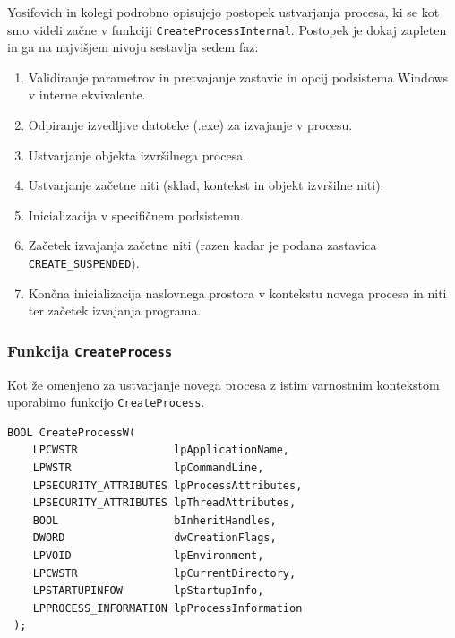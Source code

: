 \documentclass[a4paper,12pt,openright]{book}
\begin{document}
Yosifovich in kolegi \cite{Yosifovich_Russinovich_Solomon_Ionescu_2017} podrobno opisujejo postopek ustvarjanja procesa, ki se kot smo videli začne v funkciji \texttt{CreateProcessInternal}.
Postopek je dokaj zapleten in ga na najvišjem nivoju sestavlja sedem faz:
\begin{enumerate}
	\item Validiranje parametrov in pretvajanje zastavic in opcij podsistema Windows v interne ekvivalente.
	\item Odpiranje izvedljive datoteke (.exe) za izvajanje v procesu.
	\item Ustvarjanje objekta izvršilnega procesa.
	\item Ustvarjanje začetne niti (sklad, kontekst in objekt izvršilne niti).
	\item Inicializacija v specifičnem podsistemu.
	\item Začetek izvajanja začetne niti (razen kadar je podana zastavica \texttt{CREATE\_SUSPENDED}).
	\item Končna inicializacija naslovnega prostora v kontekstu novega procesa in niti ter začetek izvajanja programa.
\end{enumerate}

\subsubsection{Funkcija \texttt{CreateProcess}}

Kot že omenjeno za ustvarjanje novega procesa z istim varnostnim kontekstom uporabimo funkcijo \texttt{CreateProcess}.

\begin{lstlisting}[style=func]
 BOOL CreateProcessW(
	LPCWSTR               lpApplicationName,
	LPWSTR                lpCommandLine,
	LPSECURITY_ATTRIBUTES lpProcessAttributes,
	LPSECURITY_ATTRIBUTES lpThreadAttributes,
	BOOL                  bInheritHandles,
	DWORD                 dwCreationFlags,
	LPVOID                lpEnvironment,
	LPCWSTR               lpCurrentDirectory,
	LPSTARTUPINFOW        lpStartupInfo,
	LPPROCESS_INFORMATION lpProcessInformation
 );
\end{lstlisting}
\end{document}
